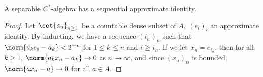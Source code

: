 \documentclass[10pt]{mypackage}
\begin{document}
\begin{corollary}
  A separable $C^{\ast}$-algebra has a sequential approximate identity.
\end{corollary}
\begin{proof}
  Let $\set{a_n}_{n\geq 1}$ be a countable dense subset of $A$, $\left( e_i \right)_{i}$ an approximate identity. By inducting, we have a sequence $\left( i_n \right)_n$ such that $\norm{a_ke_i - a_k} < 2^{-n}$ for $1\leq k \leq n$ and $i\geq i_n$. If we let $x_n = e_{i_n}$, then for all $k\geq 1$, $\norm{a_kx_n - a_k}\rightarrow 0$ as $n\rightarrow\infty$, and since $\left( x_n \right)_n$ is bounded, $\norm{ax_n - a} \rightarrow 0$ for all $a\in A$.
\end{proof}
\nocite{conway_functional_analysis,kadison_and_ringrose_1,conway_operator_theory}
\printbibliography
\end{document}
